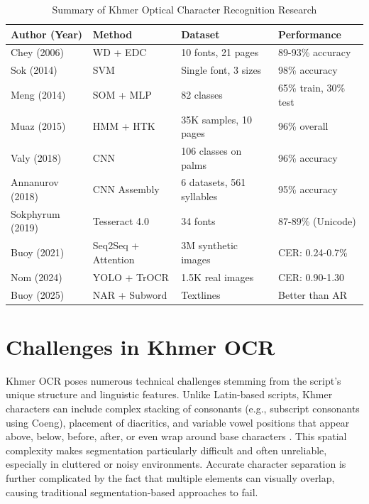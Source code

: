 {\begin{table}[H]
\centering
\caption{Summary of Khmer Optical Character Recognition Research}
\renewcommand{\arraystretch}{1.5}
\begin{tabular}{|p{3.5cm}|p{3.8cm}|p{5cm}|p{3.5cm}|}
\hline
\textbf{Author (Year)} & \textbf{Method} & \textbf{Dataset} & \textbf{Performance} \\
\hline
Chey (2006) & WD + EDC & 10 fonts, 21 pages & 89-93\% accuracy \\
\hline
Sok (2014) & SVM & Single font, 3 sizes & 98\% accuracy \\
\hline
Meng (2014) & SOM + MLP & 82 classes & 65\% train, 30\% test \\
\hline
Muaz (2015) & HMM + HTK & 35K samples, 10 pages & 96\% overall \\
\hline
Valy (2018) & CNN & 106 classes on palms & 96\% accuracy \\
\hline
Annanurov (2018) & CNN Assembly & 6 datasets, 561 syllables & 95\% accuracy \\
\hline
Sokphyrum (2019) & Tesseract 4.0 & 34 fonts & 87-89\% (Unicode) \\
\hline
Buoy (2021) & Seq2Seq + Attention & 3M synthetic images & CER: 0.24-0.7\% \\
\hline
Nom (2024) & YOLO + TrOCR & 1.5K real images & CER: 0.90-1.30 \\
\hline
Buoy (2025) & NAR + Subword & Textlines & Better than AR \\
\hline
\end{tabular}
\label{tab:khmer_ocr_summary}
\end{table}


\section{Challenges in Khmer OCR}
\label{sec:datasets}

Khmer OCR poses numerous technical challenges stemming from the script's unique structure and 
linguistic features. Unlike Latin-based scripts, Khmer characters can include complex stacking 
of consonants (e.g., subscript consonants using Coeng), placement of diacritics, and variable vowel 
positions that appear above, below, before, after, or even wrap around base characters \citep{buoy2021seq2seq}. 
This spatial complexity makes segmentation particularly difficult and often unreliable, 
especially in cluttered or noisy environments. Accurate character separation is further complicated 
by the fact that multiple elements can visually overlap, causing traditional segmentation-based 
approaches to fail.

}
